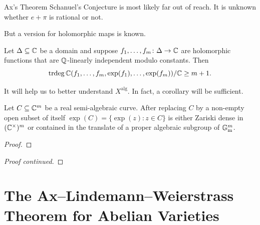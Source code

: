 \documentclass{beamer}
\begin{document}
\begin{frame}{Ax's Theorem}
  Schanuel's Conjecture is most likely far out of reach.
  It is unknown whether $e+\pi$ is rational or not. 

  But a version for holomorphic maps is known.
  
  \begin{theorem}[Ax]
    Let $\Delta\subseteq{\mathbb{C}}$ be a domain and suppose
    $f_1,\ldots,f_m \colon\Delta \rightarrow{\mathbb{C}}$ are holomorphic
    functions that are ${\mathbb{Q}}$-linearly independent \alert{modulo
      constants}. Then
    \begin{equation*}
      \mathrm{trdeg}\,{\mathbb{C}}(f_1,\ldots,f_m,\exp(f_1),\ldots,\exp(f_m))/{\mathbb{C}} \ge
      m+1. 
    \end{equation*}  
  \end{theorem}

  It will help us to better understand $X^{\mathrm{alg}}$. In fact, a
  corollary will be sufficient.
\end{frame}

\begin{frame}
  \begin{corollary}
    Let $C\subseteq{\mathbb{C}}^m$ be a real semi-algebraic curve.
    After replacing $C$ by a non-empty open subset of itself
    $\exp(C)=\{\exp(z) :z\in
    C\}$ is either Zariski dense in
    $({\mathbb{C}}^\times)^m$ or contained in
    the
    translate of a proper algebraic subgroup of ${\mathbb{G}}_{\mathrm{m}}^m$.   
  \end{corollary}
  \begin{proof}\renewcommand{\qedsymbol}{}
    \vspace{4cm}
  \end{proof}
\end{frame}

\begin{frame}
  \begin{proof}[Proof continued]
    \vspace{7cm}
  \end{proof}
\end{frame}


\section{The Ax--Lindemann--Weierstrass Theorem for Abelian Varieties}
\end{document}
